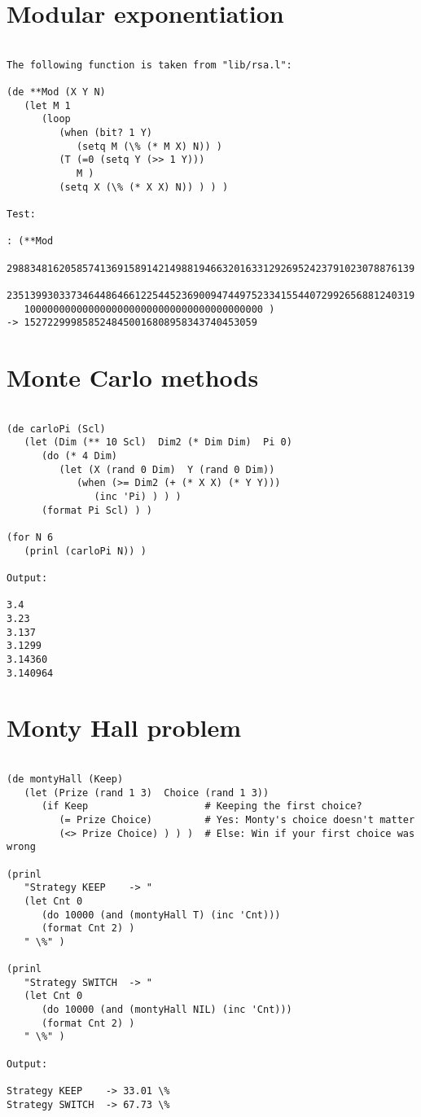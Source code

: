 \section*{Modular exponentiation}

\begin{verbatim}

The following function is taken from "lib/rsa.l":

(de **Mod (X Y N)
   (let M 1
      (loop
         (when (bit? 1 Y)
            (setq M (\% (* M X) N)) )
         (T (=0 (setq Y (>> 1 Y)))
            M )
         (setq X (\% (* X X) N)) ) ) )

Test:

: (**Mod
   2988348162058574136915891421498819466320163312926952423791023078876139
   2351399303373464486466122544523690094744975233415544072992656881240319
   10000000000000000000000000000000000000000 )
-> 1527229998585248450016808958343740453059
\end{verbatim}

\section*{Monte Carlo methods}

\begin{verbatim}

(de carloPi (Scl)
   (let (Dim (** 10 Scl)  Dim2 (* Dim Dim)  Pi 0)
      (do (* 4 Dim)
         (let (X (rand 0 Dim)  Y (rand 0 Dim))
            (when (>= Dim2 (+ (* X X) (* Y Y)))
               (inc 'Pi) ) ) )
      (format Pi Scl) ) )

(for N 6
   (prinl (carloPi N)) )

Output:

3.4
3.23
3.137
3.1299
3.14360
3.140964

\end{verbatim}

\section*{Monty Hall problem}

\begin{verbatim}

(de montyHall (Keep)
   (let (Prize (rand 1 3)  Choice (rand 1 3))
      (if Keep                    # Keeping the first choice?
         (= Prize Choice)         # Yes: Monty's choice doesn't matter
         (<> Prize Choice) ) ) )  # Else: Win if your first choice was wrong

(prinl
   "Strategy KEEP    -> "
   (let Cnt 0
      (do 10000 (and (montyHall T) (inc 'Cnt)))
      (format Cnt 2) )
   " \%" )

(prinl
   "Strategy SWITCH  -> "
   (let Cnt 0
      (do 10000 (and (montyHall NIL) (inc 'Cnt)))
      (format Cnt 2) )
   " \%" )

Output:

Strategy KEEP    -> 33.01 \%
Strategy SWITCH  -> 67.73 \%

\end{verbatim}


